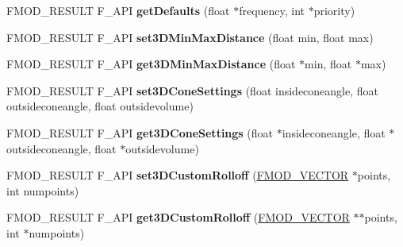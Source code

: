 \begin{DoxyCompactItemize}
\item 
\hypertarget{class_f_m_o_d_1_1_sound_a985bdd51ef10085677bb1b3cfd160e03}{F\+M\+O\+D\+\_\+\+R\+E\+S\+U\+L\+T F\+\_\+\+A\+P\+I {\bfseries get\+Defaults} (float $\ast$frequency, int $\ast$priority)}\label{class_f_m_o_d_1_1_sound_a985bdd51ef10085677bb1b3cfd160e03}

\item 
\hypertarget{class_f_m_o_d_1_1_sound_acc2bb0f37e41ccdacfc27ec28cd2cd26}{F\+M\+O\+D\+\_\+\+R\+E\+S\+U\+L\+T F\+\_\+\+A\+P\+I {\bfseries set3\+D\+Min\+Max\+Distance} (float min, float max)}\label{class_f_m_o_d_1_1_sound_acc2bb0f37e41ccdacfc27ec28cd2cd26}

\item 
\hypertarget{class_f_m_o_d_1_1_sound_aca77cc87d0375dcf9d26be19073dcc45}{F\+M\+O\+D\+\_\+\+R\+E\+S\+U\+L\+T F\+\_\+\+A\+P\+I {\bfseries get3\+D\+Min\+Max\+Distance} (float $\ast$min, float $\ast$max)}\label{class_f_m_o_d_1_1_sound_aca77cc87d0375dcf9d26be19073dcc45}

\item 
\hypertarget{class_f_m_o_d_1_1_sound_a9b239365e93cf9ec141b8239b2770e0a}{F\+M\+O\+D\+\_\+\+R\+E\+S\+U\+L\+T F\+\_\+\+A\+P\+I {\bfseries set3\+D\+Cone\+Settings} (float insideconeangle, float outsideconeangle, float outsidevolume)}\label{class_f_m_o_d_1_1_sound_a9b239365e93cf9ec141b8239b2770e0a}

\item 
\hypertarget{class_f_m_o_d_1_1_sound_a9033acfd185c7e24c706e83effbdb516}{F\+M\+O\+D\+\_\+\+R\+E\+S\+U\+L\+T F\+\_\+\+A\+P\+I {\bfseries get3\+D\+Cone\+Settings} (float $\ast$insideconeangle, float $\ast$outsideconeangle, float $\ast$outsidevolume)}\label{class_f_m_o_d_1_1_sound_a9033acfd185c7e24c706e83effbdb516}

\item 
\hypertarget{class_f_m_o_d_1_1_sound_a277c94985b2caf5aed6125604a6d6f74}{F\+M\+O\+D\+\_\+\+R\+E\+S\+U\+L\+T F\+\_\+\+A\+P\+I {\bfseries set3\+D\+Custom\+Rolloff} (\hyperlink{struct_f_m_o_d___v_e_c_t_o_r}{F\+M\+O\+D\+\_\+\+V\+E\+C\+T\+O\+R} $\ast$points, int numpoints)}\label{class_f_m_o_d_1_1_sound_a277c94985b2caf5aed6125604a6d6f74}

\item 
\hypertarget{class_f_m_o_d_1_1_sound_aeff4d197c2a9edc1dd746b519d63f490}{F\+M\+O\+D\+\_\+\+R\+E\+S\+U\+L\+T F\+\_\+\+A\+P\+I {\bfseries get3\+D\+Custom\+Rolloff} (\hyperlink{struct_f_m_o_d___v_e_c_t_o_r}{F\+M\+O\+D\+\_\+\+V\+E\+C\+T\+O\+R} $\ast$$\ast$points, int $\ast$numpoints)}\label{class_f_m_o_d_1_1_sound_aeff4d197c2a9edc1dd746b519d63f490}


\end{DoxyCompactItemize}
